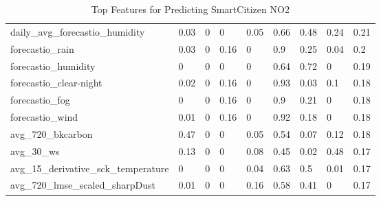 \begin{table}[H]
\begin{tabular}{lllllllll}
daily\_avg\_forecastio\_humidity           & 0.03  & 0          & 0    & 0.05 & 0.66  & 0.48      & 0.24 & 0.21 \\
forecastio\_rain                           & 0.03  & 0          & 0.16 & 0    & 0.9   & 0.25      & 0.04 & 0.2  \\
forecastio\_humidity                       & 0     & 0          & 0    & 0    & 0.64  & 0.72      & 0    & 0.19 \\
forecastio\_clear-night                    & 0.02  & 0          & 0.16 & 0    & 0.93  & 0.03      & 0.1  & 0.18 \\
forecastio\_fog                            & 0     & 0          & 0.16 & 0    & 0.9   & 0.21      & 0    & 0.18 \\
forecastio\_wind                           & 0.01  & 0          & 0.16 & 0    & 0.92  & 0.18      & 0    & 0.18 \\
avg\_720\_bkcarbon                         & 0.47  & 0          & 0    & 0.05 & 0.54  & 0.07      & 0.12 & 0.18 \\
avg\_30\_ws                                & 0.13  & 0          & 0    & 0.08 & 0.45  & 0.02      & 0.48 & 0.17 \\
avg\_15\_derivative\_sck\_temperature      & 0     & 0          & 0    & 0.04 & 0.63  & 0.5       & 0.01 & 0.17 \\
avg\_720\_lmse\_scaled\_sharpDust          & 0.01  & 0          & 0    & 0.16 & 0.58  & 0.41      & 0    & 0.17 \\
\bottomrule
\end{tabular}
\label{tab:as1_co_top_features}
\caption{Top Features for Predicting SmartCitizen NO2}
\end{table}


